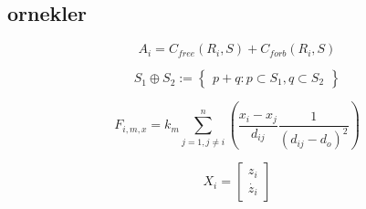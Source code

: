 \documentclass[twoside]{article}
\begin{document}
\begin{multicols}{2}
			
			
			
			
			
			
			
			
			
			
			
			
			
			
			
			
			
		
		
		
		\section{ornekler}
			\begin{equation}
			A_i = C_{free}(R_i,S) + C_{forb}(R_i,S)
			\end{equation}	
			
			
			
			\begin{equation}
			S_1 \oplus S_2 := \begin{Bmatrix}
			p+q : p \subset S_1, q \subset S_2
			\end{Bmatrix} 
			\end{equation}
			
			\begin{equation}
			F_{i,m,x} = k_m \sum_{j=1, j\neq{i}}^{n}\left({\frac{x_i - x_j}{{d_{ij}}} \frac{1}{\left(d_{ij} - d_o \right)^2} } \right)
			\end{equation}
			
			\begin{equation}
			X_i= \begin{bmatrix}
			z_i\\
			\dot{z_i}
			\end{bmatrix}
			\end{equation}
	
		
	\end{multicols}
	
\end{document}
